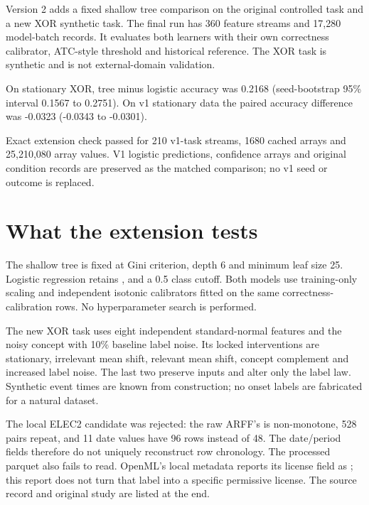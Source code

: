 \documentclass[11pt,a4paper]{article}
\begin{document}
Version 2 adds a fixed shallow tree comparison on the original controlled task and a new XOR synthetic task. The final run has 360 feature streams and 17,280 model-batch records. It evaluates both learners with their own correctness calibrator, ATC-style threshold and historical reference. The XOR task is synthetic and is not external-domain validation.\par

On stationary XOR, tree minus logistic accuracy was 0.2168 (seed-bootstrap 95\% interval 0.1567 to 0.2751). On v1 stationary data the paired accuracy difference was -0.0323 (-0.0343 to -0.0301).\par

Exact extension check passed for 210 v1-task streams, 1680 cached arrays and 25,210,080 array values. V1 logistic predictions, confidence arrays and original condition records are preserved as the matched comparison; no v1 seed or outcome is replaced.\par

\section{What the extension tests}

The shallow tree is fixed at Gini criterion, depth 6 and minimum leaf size 25. Logistic regression retains \texttt{}, \texttt{} and a 0.5 class cutoff. Both models use training-only scaling and independent isotonic calibrators fitted on the same correctness-calibration rows. No hyperparameter search is performed.\par

The new XOR task uses eight independent standard-normal features and the noisy concept \texttt{} with 10\% baseline label noise. Its locked interventions are stationary, irrelevant mean shift, relevant mean shift, concept complement and increased label noise. The last two preserve inputs and alter only the label law. Synthetic event times are known from construction; no onset labels are fabricated for a natural dataset.\par

The local ELEC2 candidate was rejected: the raw ARFF's \texttt{} is non-monotone, 528 \texttt{} pairs repeat, and 11 date values have 96 rows instead of 48. The date/period fields therefore do not uniquely reconstruct row chronology. The processed parquet also fails to read. OpenML's local metadata reports its license field as \texttt{}; this report does not turn that label into a specific permissive license. The source record and original study are listed at the end.\par
\end{document}
